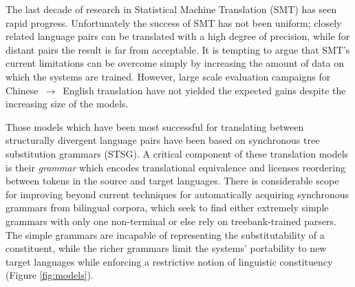 \documentclass[10pt]{article}
\begin{document}
The last decade of research in Statistical Machine Translation (SMT) has seen rapid progress. %
Unfortunately the success of SMT has not been uniform; 
closely related language pairs 
can be translated with a high degree of precision, while for distant pairs 
the result is far from acceptable. 
It is tempting to argue that SMT's current limitations can be overcome simply by increasing the amount of data on which the systems are trained. 
However, large scale evaluation campaigns for Chinese~$\rightarrow$~English translation have not yielded the expected gains despite the increasing size of the models. 

Those models which have been most successful for translating between structurally divergent language pairs have been based on synchronous tree substitution grammars (STSG). 
A critical component of these translation models is their \emph{grammar} which encodes translational equivalence and licenses reordering between tokens in the source and target languages. 
There is considerable scope for improving beyond current techniques for automatically acquiring synchronous grammars from bilingual corpora, which seek to find either extremely simple grammars with only one non-terminal or else rely on treebank-trained parsers.
The simple grammars are incapable of representing the substitutability of a constituent, while the richer grammars limit the systems' portability to new target languages while enforcing a restrictive notion of linguistic constituency (Figure \ref{fig:models}). 
\end{document}
